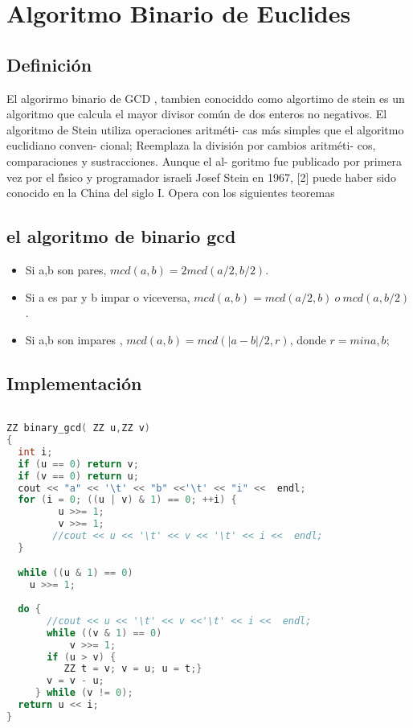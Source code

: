 \chapter{Algoritmo Binario de Euclides}
\section{Definición}
El algorirmo binario de GCD , tambien conociddo  como algortimo de stein es un algoritmo que calcula el mayor divisor común de dos enteros no negativos.
El algoritmo de Stein utiliza operaciones aritméti-
cas más simples que el algoritmo euclidiano conven-
cional; Reemplaza la división por cambios aritméti-
cos, comparaciones y sustracciones. Aunque el al-
goritmo fue publicado por primera vez por el fı́sico
y programador israelı́ Josef Stein en 1967, [2] puede
haber sido conocido en la China del siglo I.
Opera con los siguientes teoremas
\section{el algoritmo de binario gcd}
\begin{itemize}
 \item Si a,b son pares, $mcd(a,b) = 2 mcd(a/2,b/2)$.
 \item Si a es par y b impar o viceversa, $mcd(a,b) = mcd(a/2,b)\: o\: mcd(a, b/2)$.
 \item Si a,b son impares , $mcd(a,b) = mcd(|a-b|/2, r)$, donde $r = min{a,b}$;
\end{itemize}
\section{Implementación}
\begin{lstlisting}[language=C++]

ZZ binary_gcd( ZZ u,ZZ v)
{
  int i;
  if (u == 0) return v;
  if (v == 0) return u;
  cout << "a" << '\t' << "b" <<'\t' << "i" <<  endl;
  for (i = 0; ((u | v) & 1) == 0; ++i) {
         u >>= 1;
         v >>= 1;
        //cout << u << '\t' << v << '\t' << i <<  endl;      
  }

  while ((u & 1) == 0)
    u >>= 1;
    
  do {
       //cout << u << '\t' << v <<'\t' << i <<  endl;
       while ((v & 1) == 0)  
           v >>= 1;
       if (u > v) {
          ZZ t = v; v = u; u = t;}  
       v = v - u;                       
     } while (v != 0);
  return u << i;
}
\end{lstlisting}
